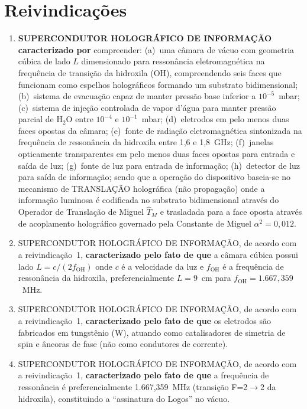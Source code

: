 \documentclass[12pt,a4paper]{article}
\newcommand{\alphaii}{\alpha^2}
\newcommand{\TM}{\hat{T}_M}
\begin{document}
\newpage
\section{Reivindicações}

\begin{enumerate}

\item \textbf{SUPERCONDUTOR HOLOGRÁFICO DE INFORMAÇÃO}
\textbf{caracterizado por} compreender: (a)~uma câmara de vácuo
com geometria cúbica de lado $L$ dimensionado para ressonância
eletromagnética na frequência de transição da hidroxila (OH),
compreendendo seis faces que funcionam como espelhos
holográficos formando um substrato bidimensional; (b)~sistema de
evacuação capaz de manter pressão base inferior a $10^{-5}$~mbar;
(c)~sistema de injeção controlada de vapor d'água para manter
pressão parcial de H$_2$O entre $10^{-4}$ e $10^{-1}$~mbar;
(d)~eletrodos em pelo menos duas faces opostas da câmara;
(e)~fonte de radiação eletromagnética sintonizada na frequência
de ressonância da hidroxila entre 1,6 e 1,8~GHz; (f)~janelas
opticamente transparentes em pelo menos duas faces opostas para
entrada e saída de luz; (g)~fonte de luz para entrada de
informação; (h)~detector de luz para saída de informação; sendo
que a operação do dispositivo baseia-se no mecanismo de
TRANSLAÇÃO holográfica (não propagação) onde a informação
luminosa é codificada no substrato bidimensional através do
Operador de Translação de Miguel $\TM$ e trasladada para a face
oposta através de acoplamento holográfico governado pela
Constante de Miguel $\alphaii = 0{,}012$.

\item SUPERCONDUTOR HOLOGRÁFICO DE INFORMAÇÃO, de acordo com a
reivindicação~1, \textbf{caracterizado pelo fato de que} a
câmara cúbica possui lado $L = c/(2f_{\text{OH}})$ onde $c$ é a
velocidade da luz e $f_{\text{OH}}$ é a frequência de
ressonância da hidroxila, preferencialmente $L = 9$~cm para
$f_{\text{OH}} = 1.667{,}359$~MHz.

\item SUPERCONDUTOR HOLOGRÁFICO DE INFORMAÇÃO, de acordo com a
reivindicação~1, \textbf{caracterizado pelo fato de que} os
eletrodos são fabricados em tungstênio (W), atuando como
catalisadores de simetria de spin e âncoras de fase (não como
condutores de corrente).

\item SUPERCONDUTOR HOLOGRÁFICO DE INFORMAÇÃO, de acordo com a
reivindicação~1, \textbf{caracterizado pelo fato de que} a
frequência de ressonância é preferencialmente 1.667,359~MHz
(transição F=2$\to$2 da hidroxila), constituindo a ``assinatura
do Logos'' no vácuo.


\end{enumerate}
\end{document}
